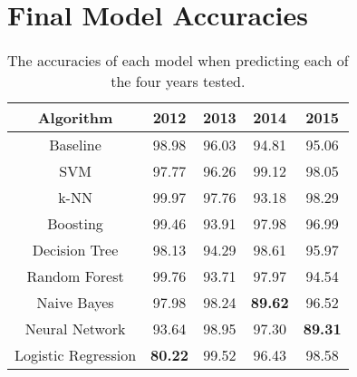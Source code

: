 \documentclass[titlepage]{article}
\begin{document}
\section{Final Model Accuracies}
\label{app:modelAccuracies}
\vspace*{\fill}
\begin{table}[!hb]
\begin{center}
\begin{tabular}{|c|c|c|c|c|}\hline
	\textbf{Algorithm}	&\textbf{2012}	&\textbf{2013}	&\textbf{2014}	&\textbf{2015}\\\hline
	Baseline			&98.98			&96.03			&94.81			&95.06\\\hline
	SVM					&97.77			&96.26			&99.12			&98.05\\\hline
	k-NN				&99.97			&97.76			&93.18			&98.29\\\hline
	Boosting			&99.46			&93.91			&97.98			&96.99\\\hline
	Decision Tree		&98.13			&94.29			&98.61			&95.97\\\hline
	Random Forest		&99.76			&93.71			&97.97			&94.54\\\hline
	Naive Bayes			&97.98			&98.24			&\textbf{89.62}	&96.52\\\hline
	Neural Network		&93.64			&98.95			&97.30			&\textbf{89.31}\\\hline
	Logistic Regression	&\textbf{80.22}	&99.52			&96.43			&98.58\\\hline
\end{tabular}
\caption{The accuracies of each model when predicting each of the four years tested.}
\end{center}
\end{table}
\vspace*{\fill}
\newpage
\end{document}
